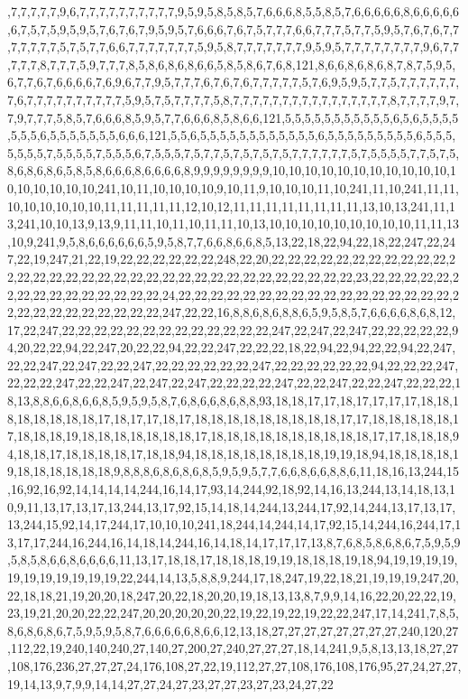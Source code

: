 ,7,7,7,7,7,9,6,7,7,7,7,7,7,7,7,7,7,9,5,9,5,8,5,8,5,7,6,6,6,8,5,5,8,5,7,6,6,6,6,6,8,6,6,6,6,6,6,7,5,7,5,9,5,9,5,7,6,7,6,7,9,5,9,5,7,6,6,6,7,6,7,5,7,7,7,6,6,7,7,7,5,7,7,5,9,5,7,6,7,6,7,7,7,7,7,7,7,5,7,5,7,7,6,6,7,7,7,7,7,7,7,5,9,5,8,7,7,7,7,7,7,7,9,5,9,5,7,7,7,7,7,7,7,7,9,6,7,7,7,7,7,8,7,7,7,5,9,7,7,7,8,5,8,6,8,6,8,6,6,5,8,5,8,6,7,6,8,121,8,6,6,8,6,8,6,8,7,8,7,5,9,5,6,7,7,6,7,6,6,6,6,7,6,9,6,7,7,9,5,7,7,7,6,7,6,7,6,7,7,7,7,7,5,7,6,9,5,9,5,7,7,5,7,7,7,7,7,7,7,6,7,7,7,7,7,7,7,7,7,7,5,9,5,7,5,7,7,7,7,5,8,7,7,7,7,7,7,7,7,7,7,7,7,7,7,7,7,8,7,7,7,7,9,7,7,9,7,7,7,5,8,5,7,6,6,6,8,5,9,5,7,7,6,6,6,8,5,8,6,6,121,5,5,5,5,5,5,5,5,5,5,5,6,5,6,5,5,5,5,5,5,5,6,5,5,5,5,5,5,5,6,6,6,121,5,5,6,5,5,5,5,5,5,5,5,5,5,5,5,6,5,5,5,5,5,5,5,5,5,6,5,5,5,5,5,5,5,7,5,5,5,5,7,5,5,5,6,7,5,5,5,7,5,7,7,5,7,5,7,5,7,5,7,7,7,7,7,7,5,7,5,5,5,5,7,7,5,7,5,8,6,8,6,8,6,5,8,5,8,6,6,6,8,6,6,6,6,8,9,9,9,9,9,9,9,9,10,10,10,10,10,10,10,10,10,10,10,10,10,10,10,10,10,241,10,11,10,10,10,10,9,10,11,9,10,10,10,11,10,241,11,10,241,11,11,10,10,10,10,10,10,11,11,11,11,11,12,10,12,11,11,11,11,11,11,11,11,13,10,13,241,11,13,241,10,10,13,9,13,9,11,11,10,11,10,11,11,10,13,10,10,10,10,10,10,10,10,10,11,11,13,10,9,241,9,5,8,6,6,6,6,6,6,5,9,5,8,7,7,6,6,8,6,6,8,5,13,22,18,22,94,22,18,22,247,22,247,22,19,247,21,22,19,22,22,22,22,22,22,248,22,20,22,22,22,22,22,22,22,22,22,22,22,22,22,22,22,22,22,22,22,22,22,22,22,22,22,22,22,22,22,22,22,22,22,23,22,22,22,22,22,22,22,22,22,22,22,22,22,22,22,24,22,22,22,22,22,22,22,22,22,22,22,22,22,22,22,22,22,22,22,22,22,22,22,22,22,22,22,247,22,22,16,8,8,6,8,6,8,8,6,5,9,5,8,5,7,6,6,6,6,8,6,8,12,17,22,247,22,22,22,22,22,22,22,22,22,22,22,22,22,247,22,247,22,247,22,22,22,22,22,94,20,22,22,94,22,247,20,22,22,94,22,22,247,22,22,22,18,22,94,22,94,22,22,94,22,247,22,22,247,22,247,22,22,247,22,22,22,22,22,22,247,22,22,22,22,22,22,94,22,22,22,247,22,22,22,247,22,22,247,22,247,22,247,22,22,22,22,247,22,22,247,22,22,247,22,22,22,18,13,8,8,6,6,8,6,6,8,5,9,5,9,5,8,7,6,8,6,6,8,6,8,8,93,18,18,17,17,18,17,17,17,17,18,18,18,18,18,18,18,18,17,18,17,17,18,17,18,18,18,18,18,18,18,18,18,17,17,18,18,18,18,18,17,18,18,18,19,18,18,18,18,18,18,18,17,18,18,18,18,18,18,18,18,18,18,17,17,18,18,18,94,18,18,17,18,18,18,18,17,18,18,94,18,18,18,18,18,18,18,18,19,19,18,94,18,18,18,18,19,18,18,18,18,18,18,9,8,8,8,6,8,6,8,6,8,5,9,5,9,5,7,7,6,6,8,6,6,8,8,6,11,18,16,13,244,15,16,92,16,92,14,14,14,14,244,16,14,17,93,14,244,92,18,92,14,16,13,244,13,14,18,13,10,9,11,13,17,13,17,13,244,13,17,92,15,14,18,14,244,13,244,17,92,14,244,13,17,13,17,13,244,15,92,14,17,244,17,10,10,10,241,18,244,14,244,14,17,92,15,14,244,16,244,17,13,17,17,244,16,244,16,14,18,14,244,16,14,18,14,17,17,17,13,8,7,6,8,5,8,6,8,6,7,5,9,5,9,5,8,5,8,6,6,8,6,6,6,6,11,13,17,18,18,17,18,18,18,19,19,18,18,18,19,18,94,19,19,19,19,19,19,19,19,19,19,19,22,244,14,13,5,8,8,9,244,17,18,247,19,22,18,21,19,19,19,247,20,22,18,18,21,19,20,20,18,247,20,22,18,20,20,19,18,13,13,8,7,9,9,14,16,22,20,22,22,19,23,19,21,20,20,22,22,247,20,20,20,20,20,22,19,22,19,22,19,22,22,247,17,14,241,7,8,5,8,6,8,6,8,6,7,5,9,5,9,5,8,7,6,6,6,6,6,8,6,6,12,13,18,27,27,27,27,27,27,27,27,240,120,27,112,22,19,240,140,240,27,140,27,200,27,240,27,27,27,18,14,241,9,5,8,13,13,18,27,27,108,176,236,27,27,27,24,176,108,27,22,19,112,27,27,108,176,108,176,95,27,24,27,27,19,14,13,9,7,9,9,14,14,27,27,24,27,23,27,27,23,27,23,24,27,22